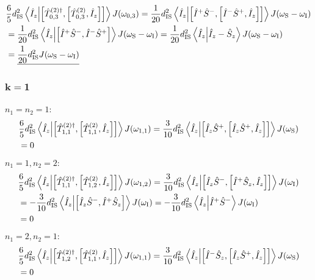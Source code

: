 \begin{appendixtext}
\begin{align*}
&\frac{6}{5} d_{\text{IS}}^2 \bra{\hat{I}_z} \ket{\comm{\hat{T}_{0,3}^{(2) \dagger}}{\comm{\hat{T}_{0,3}^{(2)}}{\hat{I}_z}}} J(\omega_{0,3}) = \frac{1}{20} d_{\text{IS}}^2 \bra{\hat{I}_z} \ket{\comm{\hat{I}^+ \hat{S}^-}{\comm{\hat{I}^- \hat{S}^+}{\hat{I}_z}}} J(\omega_{\text{S}} - \omega_{\text{I}}) \\
&= \frac{1}{20} d_{\text{IS}}^2 \bra{\hat{I}_z} \ket{\comm{\hat{I}^+ \hat{S}^-}{\hat{I}^- \hat{S}^+}} J(\omega_{\text{S}} - \omega_{\text{I}}) = \frac{1}{20} d_{\text{IS}}^2 \bra{\hat{I}_z} \ket{\hat{I}_z - \hat{S}_z} J(\omega_{\text{S}} - \omega_{\text{I}}) \\
&= \underline{\frac{1}{20} d_{\text{IS}}^2 J(\omega_{\text{S}} - \omega_{\text{I}})}
\end{align*}
\subsubsection{$\mathbf{k = 1}$}
$n_1 = n_2 = 1$:
\begin{align*}
&\frac{6}{5} d_{\text{IS}}^2 \bra{\hat{I}_z} \ket{\comm{\hat{T}_{1, 1}^{(2) \dagger}}{\comm{\hat{T}_{1,1}^{(2)}}{\hat{I}_z}}} J(\omega_{1,1}) = \frac{3}{10} d_{\text{IS}}^2 \bra{\hat{I}_z} \ket{\comm{\hat{I}_z \hat{S}^+}{\comm{\hat{I}_z \hat{S}^+}{\hat{I}_z}}} J(\omega_{\text{S}}) \\
&= 0
\end{align*}
$n_1 = 1, n_2 = 2$:
\begin{align*}
&\frac{6}{5} d_{\text{IS}}^2 \bra{\hat{I}_z} \ket{\comm{\hat{T}_{1, 1}^{(2) \dagger}}{\comm{\hat{T}_{1,2}^{(2)}}{\hat{I}_z}}} J(\omega_{1,2}) = \frac{3}{10} d_{\text{IS}}^2 \bra{\hat{I}_z} \ket{\comm{\hat{I}_z \hat{S}^-}{\comm{\hat{I}^+ \hat{S}_z}{\hat{I}_z}}} J(\omega_{\text{I}}) \\
&= -\frac{3}{10} d_{\text{IS}}^2 \bra{\hat{I}_z} \ket{\comm{\hat{I}_z \hat{S}^-}{\hat{I}^+ \hat{S}_z}} J(\omega_{\text{I}}) = -\frac{3}{10} d_{\text{IS}}^2 \bra{\hat{I}_z} \ket{\hat{I}^+ \hat{S}^-} J(\omega_{\text{I}}) \\
& = 0
\end{align*}
$n_1 = 2, n_2 = 1$:
\begin{align*}
&\frac{6}{5} d_{\text{IS}}^2 \bra{\hat{I}_z} \ket{\comm{\hat{T}_{1, 2}^{(2) \dagger}}{\comm{\hat{T}_{1,1}^{(2)}}{\hat{I}_z}}} J(\omega_{1,1}) = \frac{3}{10} d_{\text{IS}}^2 \bra{\hat{I}_z} \ket{\comm{\hat{I}^- \hat{S}_z}{\comm{\hat{I}_z \hat{S}^+}{\hat{I}_z}}} J(\omega_{\text{S}}) \\
&= 0
\end{align*}

\end{appendixtext}
